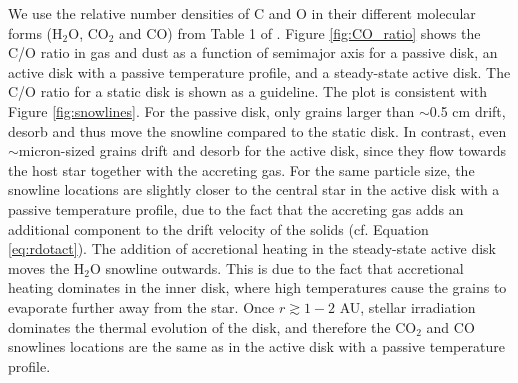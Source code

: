 \documentclass[apj]{emulateapj}
\begin{document}




We use the relative number densities of C and O in their different molecular forms (H$_2$O, CO$_2$ and CO) from Table 1 of \citet{oberg11}. Figure \ref{fig:CO_ratio} shows the C/O ratio in gas and dust as a function of semimajor axis for a passive disk, an active disk with a passive temperature profile, and a steady-state active disk. The C/O ratio for a static disk is shown as a guideline. The plot is consistent with Figure \ref{fig:snowlines}. For the passive disk, only grains larger than $\sim$0.5 cm drift, desorb and thus move the snowline compared to the static disk. In contrast, even $\sim$micron-sized grains drift and desorb for the active disk, since they flow towards the host star together with the accreting gas. For the same particle size, the snowline locations are slightly closer to the central star in the active disk with a passive temperature profile, due to the fact that the accreting gas adds an additional component to the drift velocity of the solids (cf. Equation \ref{eq:rdotact}). The addition of accretional heating in the steady-state active disk moves the H$_2$O snowline outwards. This is due to the fact that accretional heating dominates in the inner disk, where high temperatures cause the grains to evaporate further away from the star. Once $r\gtrsim1-2$  AU, stellar irradiation dominates the thermal evolution of the disk, and therefore the CO$_2$ and CO snowlines locations are the same as in the active disk with a passive temperature profile. 
\end{document}
